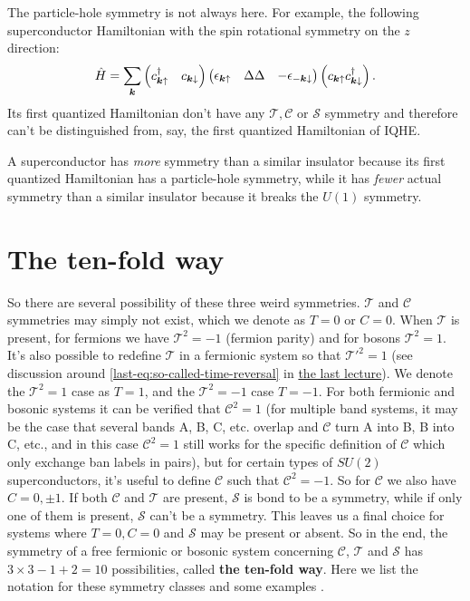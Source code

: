 \documentclass[hyperref, a4paper]{article}
\newcommand*{\concept}[1]{{\textbf{#1}}}
\newcommand{\lastlec}{\href{./2022-3-15.pdf}{the last lecture}}
\def\\{}%
\begin{document}
The particle-hole symmetry is not always here. For example, the following superconductor Hamiltonian with the spin rotational symmetry on the $z$ direction:
\begin{equation}
    \hat{H} = \sum_{\vb*{k}} \pmqty{c^\dagger_{\vb*{k} \uparrow} & c_{\vb*{k} \downarrow}} \pmqty{\epsilon_{\vb*{k} \uparrow} & \Delta \\ \Delta & - \epsilon_{- \vb*{k} \downarrow}} \pmqty{c_{\vb*{k} \uparrow} \\ c^\dagger_{\vb*{k} \downarrow}}.
    \label{eq:no-particle-hole-sc-example}
\end{equation}
Its first quantized Hamiltonian don't have any $\mathcal{T}, \mathcal{C}$ or $\mathcal{S}$ symmetry and therefore 
can't be distinguished from, say, the first quantized Hamiltonian of IQHE. 

A superconductor has \emph{more} symmetry than a similar insulator 
because its first quantized Hamiltonian has a particle-hole symmetry, while it has \emph{fewer} actual symmetry than a similar 
insulator because it breaks the $U(1)$ symmetry. 

\section{The ten-fold way}

So there are several possibility of these three weird symmetries. $\mathcal{T}$ and $\mathcal{C}$ symmetries 
may simply not exist, which we denote as ${T} = 0$ or ${C} = 0$. When $\mathcal{T}$ is present, for fermions 
we have $\mathcal{T}^2 = -1$ (fermion parity) and for bosons $\mathcal{T}^2 = 1$. It's also possible to 
redefine $\mathcal{T}$ in a fermionic system so that $\mathcal{T}'^2 = 1$ (see discussion around \eqref{last-eq:so-called-time-reversal} in \lastlec). We denote the $\mathcal{T}^2 = 1$ case as $T=1$, and the 
$\mathcal{T}^2 = -1$ case $T=-1$. For both fermionic and bosonic systems it can be verified that 
$\mathcal{C}^2 = 1$ (for multiple band systems, it may be the case that several bands A, B, C, etc. overlap
and $\mathcal{C}$ turn A into B, B into C, etc., and in this case $\mathcal{C}^2 = 1$ still works for the 
specific definition of $\mathcal{C}$ which only exchange ban labels in pairs), but for certain types of 
$SU(2)$ superconductors, it's useful to define $\mathcal{C}$ such that $\mathcal{C}^2 = -1$. 
So for $\mathcal{C}$ we also have $C = 0, \pm 1$. If both $\mathcal{C}$ and $\mathcal{T}$ are present, 
$\mathcal{S}$ is bond to be a symmetry, while if only one of them is present, $\mathcal{S}$ can't be 
a symmetry. This leaves us a final choice for systems where $T = 0, C = 0$ and $\mathcal{S}$ may be present 
or absent. So in the end, the symmetry of a free fermionic or bosonic system concerning $\mathcal{C}$, 
$\mathcal{T}$ and $\mathcal{S}$ has $3 \times 3 - 1 + 2 = 10$ possibilities, called \concept{the ten-fold way}. Here we list the notation for these symmetry classes and some examples \cite{Ryu_2010}.
\end{document}
